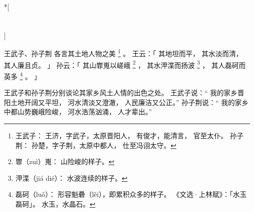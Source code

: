 
\switchcolumn[0]*[\section{}]

王武子、孙子荆
各言其土地人物之美%
\footnote{%
    王武子：
        王济，字武子，太原晋阳人，
        有俊才，能清言，
        官至太仆。
    孙子荆：
        孙楚，字子荆，太原中都人，
        仕至冯诩太守。
}%
。
王云：「
    其地坦而平，
    其水淡而清，
    其人廉且贞。
」
孙云：「
    其山㠑嵬以嵯峨%
    \footnote{%
        㠑（zuì）嵬：
            山险峻的样子。
    }%
    ，
    其水㳌渫而扬波%
    \footnote{%
        㳌渫（jiá dié）：
            水波连续的样子。
    }%
    ，
    其人磊砢而英多%
    \footnote{%
        磊砢（luǒ）：
            形容魁礨（lěi），即累积众多的样子。
            《文选·上林赋》：「水玉磊砢」。
            水玉，水晶石。
    }%
    。
」

\switchcolumn


王武子和孙子荆分别谈论其家乡风土人情的出色之处。
王武子说：“
 我的家乡晋阳土地开阔又平坦，
 河水清淡又澄澈，
 人民廉洁又公正。”
孙子荆说：“
 我的家乡中都山势巍峨险峻，
 河水浩荡汹涌，
 人才辈出。”
